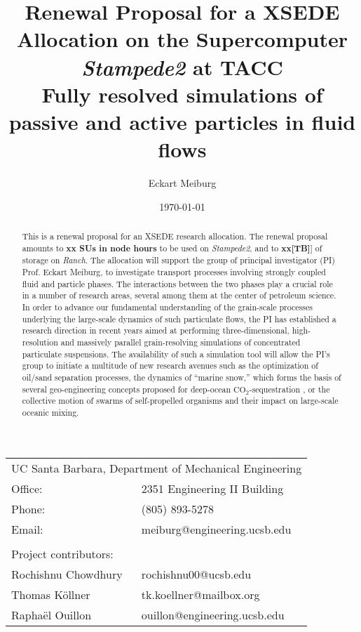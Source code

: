 \documentclass[10pt]{article}
\title{Renewal Proposal for a XSEDE Allocation on the Supercomputer {\em Stampede2} at TACC\\
       \normalsize{\textbf{Fully resolved simulations of passive and active particles in fluid flows}}} %
\author{Eckart Meiburg} %
\date{\today} %
\begin{document}
\maketitle %

\begin{center}
\begin{tabular}{l l}
\multicolumn{2}{l}{UC Santa Barbara, Department of Mechanical Engineering} \\ %
Office:          & 2351 Engineering II Building \\
Phone:           & (805) 893-5278\\
Email:           & meiburg@engineering.ucsb.edu\\
\\
\multicolumn{2}{l}{Project contributors:} \\ %
Rochishnu Chowdhury & rochishnu00@ucsb.edu \\
Thomas K\"{o}llner    & tk.koellner@mailbox.org\\
Rapha\"{e}l Ouillon    & ouillon@engineering.ucsb.edu\\
\end{tabular}
\end{center}

 \begin{abstract}
This is a renewal proposal for an XSEDE research allocation. The renewal proposal amounts to \textbf{xx SUs in node hours} to be used on \emph{Stampede2}, and to \textbf{xx[TB]}] of storage on \emph{Ranch}. The allocation will support the group of principal investigator (PI) Prof. Eckart Meiburg, to investigate transport processes involving strongly coupled fluid and particle phases. The interactions between the two phases play a crucial role in a number of research areas, several among them at the center of petroleum science. In order to advance our fundamental understanding of the grain-scale processes underlying the large-scale dynamics of such particulate flows, the PI has established a research direction in recent years aimed at performing three-dimensional, high-resolution and massively parallel grain-resolving simulations of concentrated particulate suspensions. The availability of such a simulation tool will allow the PI's group to initiate a multitude of new research avenues such as the optimization of oil/sand separation processes, the dynamics of “marine snow,” which forms the basis of several geo-engineering concepts proposed for deep-ocean $\text{CO}_2$-sequestration \cite{Lampitt2008}, or the collective motion of swarms of self-propelled organisms and their impact on large-scale oceanic mixing.
 \end{abstract}
\end{document}
